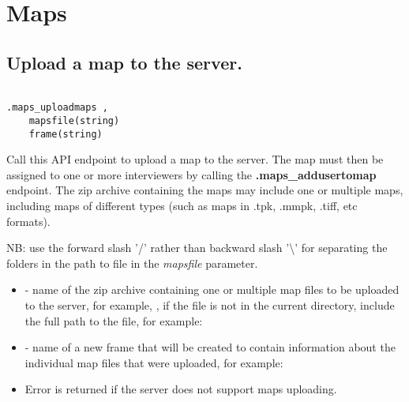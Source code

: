 \section{Maps}


\subsection{Upload a map to the server.}
\begin{lstlisting}[style=CommandLineStyle, showlines=true]

.maps_uploadmaps ,
    mapsfile(string)
    frame(string)

\end{lstlisting}

Call this API endpoint to upload a map to the server. The map must then be
assigned to one or more interviewers by calling the \textbf{.maps\_addusertomap}
endpoint. The zip archive containing the maps may include one or multiple maps,
including maps of different types (such as maps in .tpk, .mmpk, .tiff, etc formats).

NB: use the forward slash '\slash' rather than backward slash '\textbackslash' for
separating the folders in the path to file in the \textit{mapsfile} parameter.

\paramsheader
\begin{itemize}

  \item {} - name of the zip archive containing one or multiple
        map files to be uploaded to the server, for example, , if the file is not in the current
        directory, include the full path to the file, for example: \newline

  \item {} - name of a new frame that will be created to contain
        information about the individual map files that were uploaded, for
        example: \newline

\end{itemize}

\errheader
\begin{itemize}
    \item Error  is returned if the server does not support
    maps uploading.
\end{itemize}

